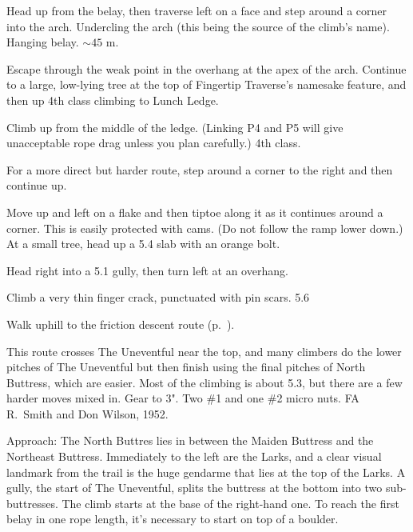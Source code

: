 \documentclass{tahquitz}
\begin{document}
 Head up from the belay, then traverse left on a face and
step around a corner into the arch. Undercling the arch (this being
the source of the climb's name). Hanging belay. $\sim45$ m.

 Escape through the weak point in the overhang at the apex
of the arch. Continue to a large, low-lying tree at the top of Fingertip Traverse's
namesake feature, and then up 4th class climbing to Lunch Ledge.


 Climb up from the middle of the ledge. (Linking P4 and P5 will
give unacceptable rope drag unless you plan carefully.) 4th class.

 For a more direct but harder route, step around a corner
to the right and then continue up.

 Move up and left on a flake
and then tiptoe along it as it continues around a corner.
This is easily protected with cams. (Do not follow the ramp lower down.) At a small
tree, head up a 5.4 slab with an orange bolt.

 Head right into a 5.1 gully, then turn left at an overhang.

 Climb a very thin finger crack, punctuated with pin scars. 5.6

Walk uphill to the friction descent route  (p.~\pageref{subsec:friction-descent}).





This route crosses The Uneventful near the top, and many climbers do the lower
pitches of The Uneventful but then finish using the final pitches of
North Buttress, which are easier. Most of the climbing is about 5.3,
but there are a few harder moves mixed in. Gear to 3". Two \#1 and one \#2 micro nuts.
FA R.~Smith and Don Wilson, 1952.

Approach: The North Buttres lies
in between the Maiden Buttress and the Northeast Buttress. Immediately
to the left are the Larks, and a clear visual landmark from the trail
is the huge gendarme that lies at the top of the Larks. A gully, the start
of The Uneventful, splits the buttress at the bottom into two sub-buttresses.
The climb starts at the base of the right-hand one.
To reach the first belay in one rope length, it's necessary to start on top of a boulder.
\end{document}
